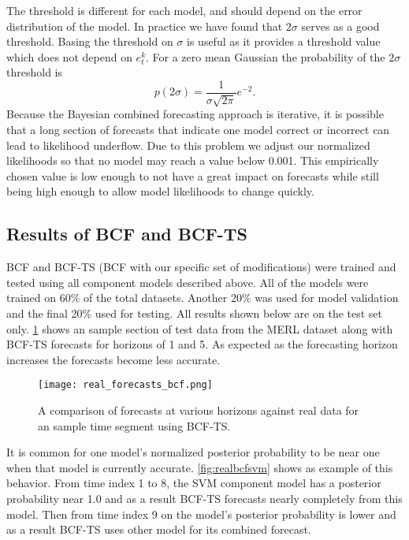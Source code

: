 The threshold is different for each model, and should depend on the error distribution of the model.  In practice we have found that $2\sigma$ serves as a good threshold.  Basing the threshold on $\sigma$ is useful as it provides a threshold value which does not depend on $e^{k}_{t}$.  For a zero mean Gaussian the probability of the $2\sigma$ threshold is
\begin{equation}
p(2\sigma) = \frac{1}{\sigma\sqrt{2\pi}}e^{-2}.
\end{equation}
Because the Bayesian combined forecasting approach is iterative, it is possible that a long section of forecasts that indicate one model correct or incorrect can lead to likelihood underflow.  Due to this problem we adjust our normalized likelihoods so that no model may reach a value below 0.001.  This empirically chosen value is low enough to not have a great impact on forecasts while still being high enough to allow model likelihoods to change quickly.

\subsection{Results of BCF and BCF-TS}

BCF and BCF-TS (BCF with our specific set of modifications) were trained and tested using all component models described above.  All of the models were trained on 60\% of the total datasets.  Another 20\% was used for model validation and the final 20\% used for testing.  All results shown below are on the test set only.  \ref{fig:realbcf} shows an sample section of test data from the MERL dataset along with BCF-TS forecasts for horizons of 1 and 5.   As expected as the forecasting horizon increases the forecasts become less accurate.

\begin{figure}[h]
\centering
\texttt{[image: real\_forecasts\_bcf.png]}
\caption{A comparison of forecasts at various horizons against real data for an sample time segment using BCF-TS.}
\label{fig:realbcf}
\end{figure}

It is common for one model's normalized posterior probability to be near one when that model is currently accurate.  \ref{fig:realbcfsvm} shows as example of this behavior.  From time index 1 to 8, the SVM component model has a posterior probability near 1.0 and as a result BCF-TS forecasts nearly completely from this model.  Then from time index 9 on the model's posterior probability is lower and as a result BCF-TS uses other model for its combined forecast.

